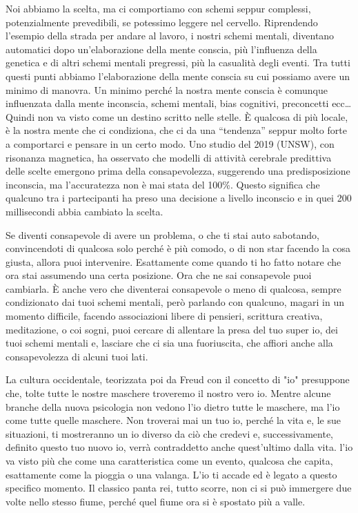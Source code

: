 \documentclass[12pt]{book} %
\begin{document}
Noi abbiamo la scelta, ma ci comportiamo con schemi seppur complessi, potenzialmente prevedibili, se potessimo leggere
nel cervello. Riprendendo l'esempio della strada per andare al lavoro, i nostri schemi mentali,
diventano automatici dopo un'elaborazione della mente conscia, più
l'influenza della genetica e di altri schemi mentali pregressi, più la casualità degli eventi. Tra
tutti questi punti abbiamo l'elaborazione della mente conscia su cui possiamo avere un minimo di
manovra. Un minimo perché la nostra mente conscia è comunque influenzata dalla mente inconscia, schemi mentali, bias
cognitivi, preconcetti ecc… Quindi non va visto come un destino scritto nelle stelle. È qualcosa di più locale, è la
nostra mente che ci condiziona, che ci da una “tendenza” seppur molto forte a comportarci e pensare in un certo modo.
Uno studio del 2019 (UNSW), con risonanza magnetica, ha osservato che modelli di attività cerebrale predittiva delle scelte emergono prima della consapevolezza, suggerendo una predisposizione inconscia, ma l’accuratezza non è mai stata del 100\%.
Questo significa che qualcuno tra i partecipanti ha preso
una decisione a livello inconscio e in quei 200 millisecondi abbia cambiato la
scelta.

Se diventi consapevole di avere un problema, o che ti stai auto sabotando,
convincendoti di qualcosa solo perché è più comodo, o di non star facendo la cosa giusta, allora puoi intervenire.
Esattamente come quando ti ho fatto notare che ora stai assumendo una certa posizione. Ora che ne sai consapevole puoi
cambiarla. È anche vero che diventerai consapevole o meno di qualcosa, sempre condizionato dai tuoi schemi mentali,
però parlando con qualcuno, magari in un momento difficile, facendo associazioni libere di pensieri, scrittura
creativa, meditazione, o coi sogni, puoi cercare di allentare la presa del tuo super io, dei tuoi schemi mentali e,
lasciare che ci sia una fuoriuscita, che affiori anche alla consapevolezza di alcuni tuoi lati.

La cultura occidentale, teorizzata poi da Freud con il concetto di "io" presuppone che,
tolte tutte le nostre maschere troveremo il nostro vero io. Mentre alcune branche della nuova psicologia non vedono
l'io dietro tutte le maschere, ma l'io come tutte quelle maschere. Non troverai mai un tuo io, perché la vita e, le sue
situazioni, ti mostreranno un io diverso da ciò che credevi e, successivamente, definito questo tuo nuovo io, verrà
contraddetto anche quest'ultimo dalla vita. l'io va visto più che come una caratteristica come un
evento, qualcosa che capita, esattamente come la pioggia o una valanga. L'io ti accade ed è legato a questo specifico
momento. Il classico panta rei, tutto scorre, non ci si può immergere due volte nello stesso fiume, perché quel fiume
ora si è spostato più a valle.
\end{document}
